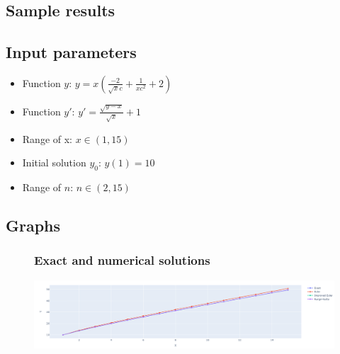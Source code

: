\documentclass[12pt,letterpaper]{article}
\begin{document}
\begin{center}
    \section*{Sample results}
    \subsection*{Input parameters}
\end{center}

\begin{itemize}
    \item
         Function $y$: $y = x(\frac{-2}{\sqrt{x}c} + \frac{1}{xc^2} + 2)$
    \item
         Function $y'$: $y' = \frac{\sqrt{y - x}}{\sqrt{x}} + 1$
    \item
         Range of x: $x \in (1, 15)$
    \item
         Initial solution $y_0$: $y(1) = 10$
    \item
         Range of $n$: $n \in (2, 15)$
\end{itemize}

\begin{center}
    \subsection*{Graphs}
\end{center}

    \begin{figure}[!h]
    \begin{center}
            \subsubsection*{Exact and numerical solutions}
        \end{center}
        \centering
            \includegraphics[width=1\linewidth]{solutions.png}
    \end{figure}
\end{document}

